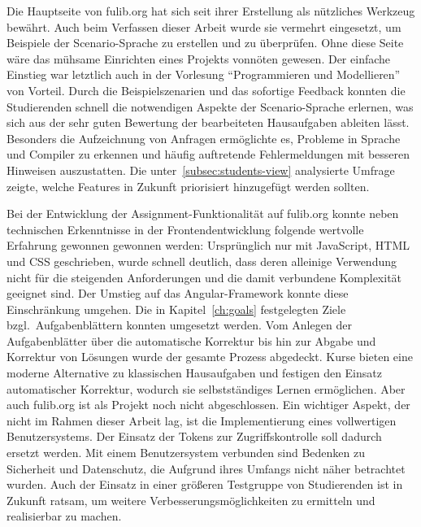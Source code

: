 Die Hauptseite von fulib.org hat sich seit ihrer Erstellung als nützliches Werkzeug bewährt.
Auch beim Verfassen dieser Arbeit wurde sie vermehrt eingesetzt, um Beispiele der Scenario-Sprache zu erstellen und zu überprüfen.
Ohne diese Seite wäre das mühsame Einrichten eines Projekts vonnöten gewesen.
Der einfache Einstieg war letztlich auch in der Vorlesung ``Programmieren und Modellieren'' von Vorteil.
Durch die Beispielszenarien und das sofortige Feedback konnten die Studierenden schnell die notwendigen Aspekte der Scenario-Sprache erlernen, was sich aus der sehr guten Bewertung der bearbeiteten Hausaufgaben ableiten lässt.
Besonders die Aufzeichnung von Anfragen ermöglichte es, Probleme in Sprache und Compiler zu erkennen und häufig auftretende Fehlermeldungen mit besseren Hinweisen auszustatten.
Die unter~\ref{subsec:students-view} analysierte Umfrage zeigte, welche Features in Zukunft priorisiert hinzugefügt werden sollten.

Bei der Entwicklung der Assignment-Funktionalität auf fulib.org konnte neben technischen Erkenntnisse in der Frontendentwicklung folgende wertvolle Erfahrung gewonnen gewonnen werden:
Ursprünglich nur mit JavaScript, HTML und CSS geschrieben, wurde schnell deutlich, dass deren alleinige Verwendung nicht für die steigenden Anforderungen und die damit verbundene Komplexität geeignet sind.
Der Umstieg auf das Angular-Framework konnte diese Einschränkung umgehen.
Die in Kapitel~\ref{ch:goals} festgelegten Ziele bzgl.\ Aufgabenblättern konnten umgesetzt werden.
Vom Anlegen der Aufgabenblätter über die automatische Korrektur bis hin zur Abgabe und Korrektur von Lösungen wurde der gesamte Prozess abgedeckt.
Kurse bieten eine moderne Alternative zu klassischen Hausaufgaben und festigen den Einsatz automatischer Korrektur, wodurch sie selbstständiges Lernen ermöglichen.
Aber auch fulib.org ist als Projekt noch nicht abgeschlossen.
Ein wichtiger Aspekt, der nicht im Rahmen dieser Arbeit lag, ist die Implementierung eines vollwertigen Benutzersystems.
Der Einsatz der Tokens zur Zugriffskontrolle soll dadurch ersetzt werden.
Mit einem Benutzersystem verbunden sind Bedenken zu Sicherheit und Datenschutz, die Aufgrund ihres Umfangs nicht näher betrachtet wurden.
Auch der Einsatz in einer größeren Testgruppe von Studierenden ist in Zukunft ratsam, um weitere Verbesserungsmöglichkeiten zu ermitteln und realisierbar zu machen.
